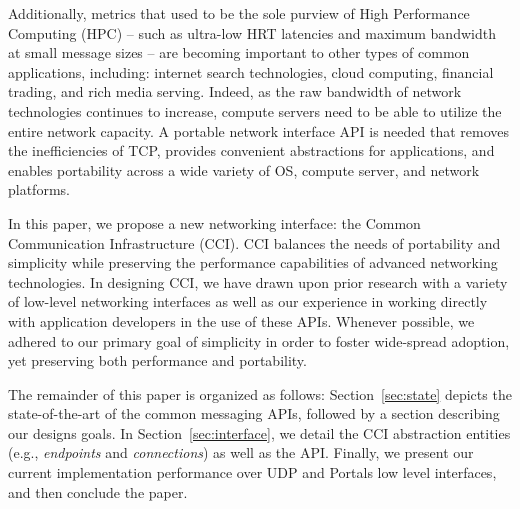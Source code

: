 Additionally, metrics that used to be the sole purview of High
Performance Computing (HPC) -- such as ultra-low HRT latencies and
maximum bandwidth at small message sizes -- are becoming important
to other types of common applications, including: internet search
technologies, cloud computing, financial trading, and rich media
serving.
%
Indeed, as the raw bandwidth of network technologies continues to
increase, compute servers need to be able to utilize the entire
network capacity.
%
A portable network interface API is needed that removes the
inefficiencies of TCP, provides convenient abstractions for
applications, and enables portability across a wide variety of OS,
compute server, and network platforms.

In this paper, we propose a new networking interface: the Common
Communication Infrastructure (CCI).  
%
CCI balances the needs of portability and simplicity while preserving
the performance capabilities of advanced networking technologies. 
%
In designing CCI, we have drawn upon prior research with a variety of
low-level networking interfaces as well as our experience in working
directly with application developers in the use of these APIs.
%
Whenever possible, we adhered to our primary goal of simplicity in
order to foster wide-spread adoption, yet preserving both performance
and portability.

The remainder of this paper is organized as follows:
%
Section~\ref{sec:state} depicts the state-of-the-art of the common
messaging APIs, followed by a section describing our designs goals.
%
In Section~\ref{sec:interface}, we detail the CCI abstraction entities
(e.g., {\em endpoints} and {\em connections}) as well as the API.
%
Finally, we present our current implementation performance over UDP
and Portals low level interfaces, and then conclude the paper.



